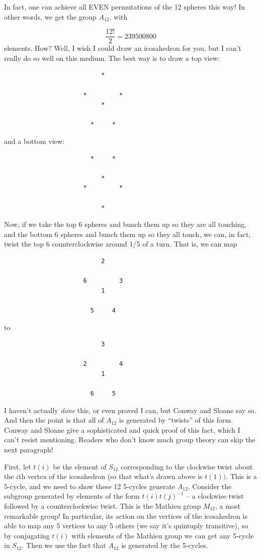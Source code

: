 In fact, one can achieve all EVEN permutations of the 12 spheres this way! In other words, we get the group $A_{12}$, with

\[ \frac{12!}{2} = 239500800\]
elements. How? Well, I wish I could draw an icosahedron for you, but I can't really do so well on this medium. The best way is to draw a top view:
\begin{verbatim}
                           *
 
                      *         *
                           *
                        
                        *     *
\end{verbatim}
and a bottom view:
\begin{verbatim}
                        *     *

                           *
                      *         *  
                    
                           *
\end{verbatim}
Now, if we take the top 6 spheres and bunch them up so they are all touching, and the bottom 6 spheres and bunch them up so they all touch, we can, in fact, twist the top 6 counterclockwise around 1/5 of a turn. That is, we can map
\begin{verbatim}
                           2
 
                      6         3
                           1
                        
                        5     4
\end{verbatim}
to
\begin{verbatim}
                           3
 
                      2         4
                           1
                        
                        6     5
\end{verbatim}

I haven't actually \emph{done} this, or even proved I can, but Conway and Sloane say so. And then the point is that all of $A_{12}$ is generated by ``twists'' of this form. Conway and Sloane give a sophisticated and quick proof of this fact, which I can't resist mentioning. Readers who don't know much group theory can skip the next paragraph!

First, let $t(i)$ be the element of $S_{12}$ corresponding to the clockwise twist about the $i$th vertex of the icosahedron (so that what's drawn above is $t(1))$. This is a 5-cycle, and we need to show these 12 5-cycles generate $A_{12}$. Consider the subgroup generated by elements of the form $t(i)t(j)^{-1}$ -- a clockwise twist followed by a counterclockwise twist. This is the Mathieu group $M_{12}$, a most remarkable group! In particular, its action on the vertices of the icosahedron is able to map any 5 vertices to any 5 others (we say it's quintuply transitive), so by conjugating $t(i)$ with elements of the Mathieu group we can get any 5-cycle in $S_{12}$. Then we use the fact that $A_{12}$ is generated by the 5-cycles.


